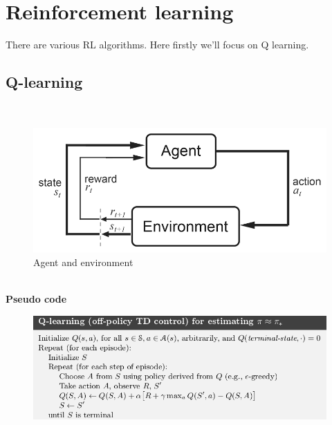 \chapter{Reinforcement learning}

There are various RL algorithms. Here firstly we'll focus on Q learning.
\section{Q-learning}
\\
\begin{figure}
    \centering
    \includegraphics[width=\textwidth]{images/qlearn.png}
    \caption{Agent and environment}
\end{figure}
\\
\newline \textbf{Pseudo code}
\begin{figure}
    \centering
    \includegraphics[width=\textwidth]{images/qlearnpseudo.png}
\end{figure}
\\
